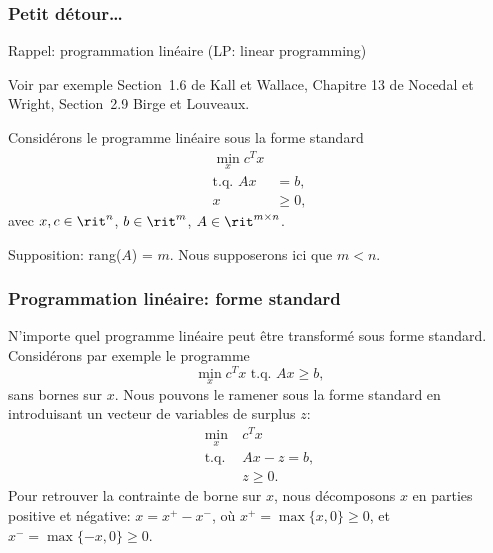 
\begin{frame}
\frametitle{Petit détour\ldots}

{\red Rappel: programmation linéaire (LP: linear programming)}

\mbox{}

Voir par exemple Section~1.6 de Kall et Wallace, Chapitre 13 de
Nocedal et Wright, Section~2.9 Birge et Louveaux.

\mbox{}

Considérons le programme linéaire sous la forme standard
\begin{align*}
\min_x c^Tx \\
\mbox{t.q. } Ax &= b,\\
x &\geq 0,
\end{align*}
avec $x, c \in \rit^n$, $b \in \rit^m$, $A \in \rit^{m \times n}$.

\mbox{}

Supposition: rang($A$) = $m$. Nous supposerons ici que $m < n$.
\end{frame}

\begin{frame}
\frametitle{Programmation linéaire: forme standard}

N'importe quel programme linéaire peut être transformé sous forme
standard. Considérons par exemple le programme
\[
\min_x c^Tx \mbox{ t.q. } Ax \geq b,
\]
sans bornes sur $x$. Nous pouvons le ramener sous la forme standard en
introduisant un vecteur de variables de surplus $z$:
\begin{align*}
\min_x\ & c^Tx \\
\mbox{t.q. } & Ax - z = b,\\
& z \geq 0.
\end{align*}
Pour retrouver la contrainte de borne sur $x$, nous décomposons $x$ en
parties positive et négative: $x = x^+-x^-$, où $x^+ = \max \lbrace x,
0 \rbrace \geq 0$, et $x^- = \max \lbrace -x, 0 \rbrace \geq 0$.
\end{frame}

